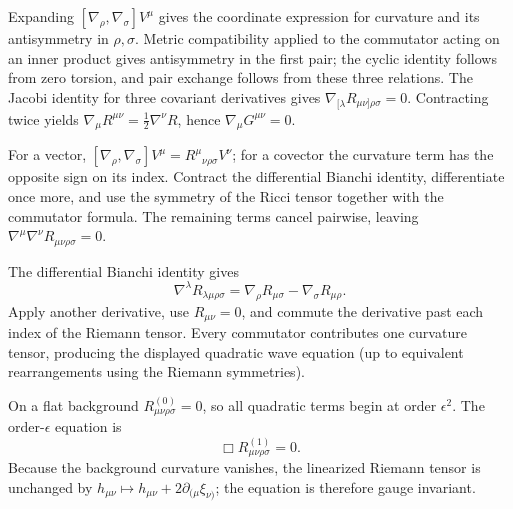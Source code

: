 \begin{solutions}
\begin{solution}
Expanding \([\nabla_\rho,\nabla_\sigma]V^\mu\) gives the coordinate
expression for curvature and its antisymmetry in \(\rho,\sigma\).  Metric
compatibility applied to the commutator acting on an inner product gives
antisymmetry in the first pair; the cyclic identity follows from zero
torsion, and pair exchange follows from these three relations.  The Jacobi
identity for three covariant derivatives gives
\(\nabla_{[\lambda}R_{\mu\nu]\rho\sigma}=0\).  Contracting twice yields
\(\nabla_\mu R^{\mu\nu}=\tfrac12\nabla^\nu R\), hence
\(\nabla_\mu G^{\mu\nu}=0\).

For a vector,
\([\nabla_\rho,\nabla_\sigma]V^\mu
=R^\mu{}_{\nu\rho\sigma}V^\nu\); for a covector the curvature term has the
opposite sign on its index.  Contract the differential Bianchi identity,
differentiate once more, and use the symmetry of the Ricci tensor together
with the commutator formula.  The remaining terms cancel pairwise, leaving
\(\nabla^\mu\nabla^\nu R_{\mu\nu\rho\sigma}=0\).
\end{solution}

\begin{solution}
The differential Bianchi identity gives
\[
\nabla^\lambda R_{\lambda\mu\rho\sigma}
=\nabla_\rho R_{\mu\sigma}-\nabla_\sigma R_{\mu\rho}.
\]
Apply another derivative, use \(R_{\mu\nu}=0\), and commute the derivative
past each index of the Riemann tensor.  Every commutator contributes one
curvature tensor, producing the displayed quadratic wave equation (up to
equivalent rearrangements using the Riemann symmetries).

On a flat background \(R^{(0)}_{\mu\nu\rho\sigma}=0\), so all quadratic
terms begin at order \(\epsilon^2\).  The order-\(\epsilon\) equation is
\[
\Box R^{(1)}_{\mu\nu\rho\sigma}=0.
\]
Because the background curvature vanishes, the linearized Riemann tensor is
unchanged by
\(h_{\mu\nu}\mapsto h_{\mu\nu}+2\partial_{(\mu}\xi_{\nu)}\); the equation is
therefore gauge invariant.
\end{solution}



\end{solutions}
